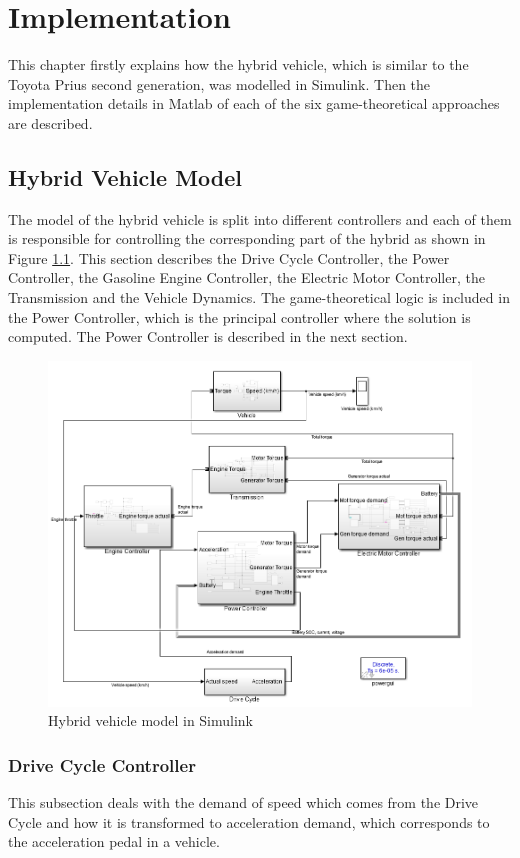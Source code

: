 \chapter{Implementation}
\label{chp:implementation}
This chapter firstly explains how the hybrid vehicle, which is similar to the Toyota Prius second generation, was modelled in Simulink. Then the implementation details in Matlab of each of the six game-theoretical approaches are described.

\section{Hybrid Vehicle Model}
The model of the hybrid vehicle is split into different controllers and each of them is responsible for controlling the corresponding part of the hybrid as shown in Figure \ref{fig:hev}. This section describes the Drive Cycle Controller, the Power Controller, the Gasoline Engine Controller, the Electric Motor Controller, the Transmission and the Vehicle Dynamics. The game-theoretical logic is included in the Power Controller, which is the principal controller where the solution is computed. The Power Controller is described in the next section.

\begin{figure}[h]
\centering
\includegraphics[scale=0.6]{figures/hev}
\caption{Hybrid vehicle model in Simulink}
\label{fig:hev}
\end{figure}

\subsection{Drive Cycle Controller}
This subsection deals with the demand of speed which comes from the Drive Cycle and how it is transformed to acceleration demand, which corresponds to the acceleration pedal in a vehicle.

